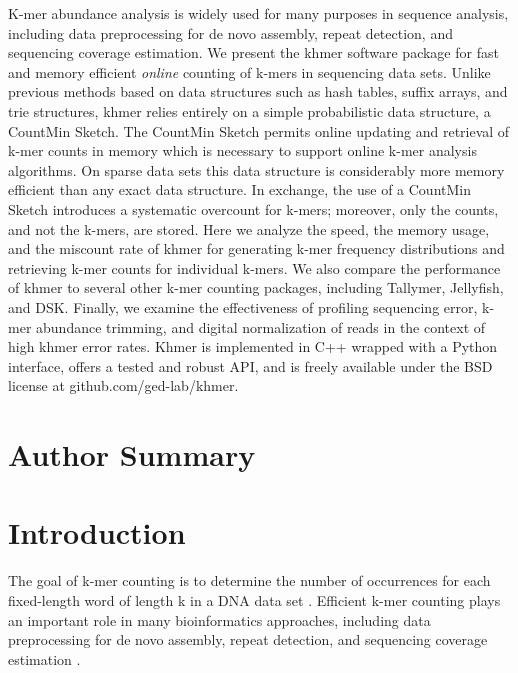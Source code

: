 \documentclass[10pt]{article}
\begin{document}
K-mer abundance analysis is widely used for many purposes in sequence
analysis, including data preprocessing for de novo assembly, repeat
detection, and sequencing coverage estimation.  We present the khmer
software package for fast and memory efficient {\em online} counting
of k-mers in sequencing data sets. Unlike previous methods based on
data structures such as hash tables, suffix arrays, and trie
structures, khmer relies entirely on a simple probabilistic data
structure, a CountMin Sketch.  The CountMin Sketch permits online
updating and retrieval of k-mer counts in memory which is necessary to
support online k-mer analysis algorithms.  On sparse data sets this
data structure is considerably more memory efficient than any exact
data structure.  In exchange, the use of a CountMin Sketch introduces
a systematic overcount for k-mers; moreover, only the counts, and not
the k-mers, are stored.  Here we analyze the speed, the memory usage,
and the miscount rate of khmer for generating k-mer frequency
distributions and retrieving k-mer counts for individual k-mers.  We
also compare the performance of khmer to several other k-mer counting
packages, including Tallymer, Jellyfish, and DSK.  Finally, we examine
the effectiveness of profiling sequencing error, k-mer abundance
trimming, and digital normalization of reads in the context of high
khmer error rates. Khmer is implemented in C++ wrapped with a Python
interface, offers a tested and robust API, and is freely available
under the BSD license at github.com/ged-lab/khmer.

\section*{Author Summary}

\section*{Introduction}

The goal of k-mer counting is to determine the number of occurrences
for each fixed-length word of length k in a DNA data set
\cite{Marcais2011}. Efficient k-mer counting plays an important role
in many bioinformatics approaches, including data preprocessing for de
novo assembly, repeat detection, and sequencing coverage estimation
\cite{Kurtz2008}.
\end{document}

